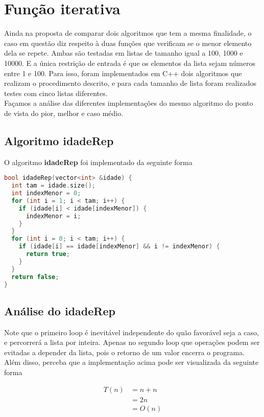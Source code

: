 \section{Função iterativa}
\label{sec:func-it}

Ainda na proposta de comparar dois algoritmos que tem a mesma finalidade, o caso em questão diz respeito à duas funções que verificam se o menor elemento dela se repete. Ambas são testadas em listas de tamanho igual a 100, 1000 e 10000. E a única restrição de entrada é que os elementos da lista sejam números entre 1 e 100. Para isso, foram implementados em C++ dois algoritmos que realizam o procedimento descrito, e para cada tamanho de lista foram realizados testes com cinco listas diferentes. \\
Façamos a análise das diferentes implementações do mesmo algoritmo do ponto de vista do pior, melhor e caso médio.

\subsection{Algoritmo idadeRep}

O algoritmo \textbf{idadeRep} foi implementado da seguinte forma

\begin{lstlisting}[language=C++]
bool idadeRep(vector<int> &idade) {
  int tam = idade.size();
  int indexMenor = 0;
  for (int i = 1; i < tam; i++) {
    if (idade[i] < idade[indexMenor]) {
      indexMenor = i;
    }
  }
  for (int i = 0; i < tam; i++) {
    if (idade[i] == idade[indexMenor] && i != indexMenor) {
      return true;
    }
  }
  return false;
}
\end{lstlisting}

\subsection{Análise do idadeRep}

Note que o primeiro loop é inevitável independente do quão favorável seja a caso, e percorrerá a lista por inteira. Apenas no segundo loop que operações podem ser evitadas a depender da lista, pois o retorno de um valor encerra o programa. Além disso, perceba que a implementação acima pode ser visualizada da seguinte forma

\begin{align*}
  T(n) & = n + n\\ 
       & = 2n \\
       & = O(n)
\end{align*}

